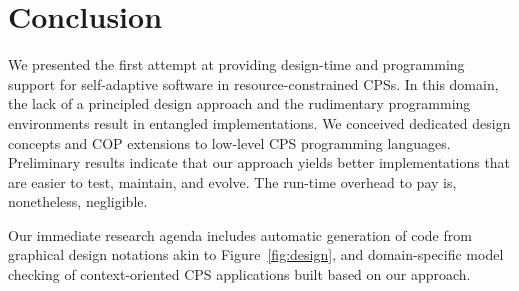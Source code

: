 \section{Conclusion}
\label{sec:ending}

We presented the first attempt at providing design-time and
programming support for self-adaptive software in re\-sour\-ce-constrained
CPSs. In this domain, the lack of a principled design approach and the
rudimentary programming environments result in entangled
implementations. We conceived dedicated design concepts and COP
extensions to low-level CPS programming languages. Preliminary results
indicate that our approach yields better implementations
that are easier to test, maintain, and evolve. The run-time overhead
to pay is, nonetheless, negligible.

Our immediate research agenda includes automatic generation of \conesc
code from graphical design notations akin to Figure~\ref{fig:design},
and domain-specific model checking of context-oriented CPS
applications built based on our approach.

